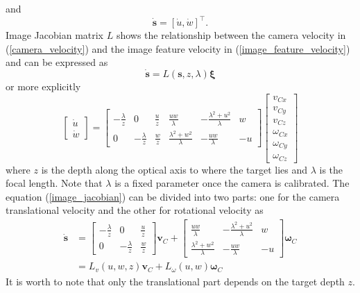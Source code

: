 and 
\begin{equation}
\mathbf{\dot{s}}=[\dot{u}, \dot{w}]^\top.
\label{image_feature_velocity}
\end{equation}
Image Jacobian matrix $L$ shows the relationship between the camera velocity in (\ref{camera_velocity}) and the image feature velocity in (\ref{image_feature_velocity}) and can be expressed as 
\begin{equation}
\mathbf{\dot{s}}=L(\mathbf{s},z,\lambda)\mathbf{\xi}
\end{equation}
or more explicitly
\begin{equation}
\begin{bmatrix}
\dot{u} \\ \dot{w}
\end{bmatrix}
=\begin{bmatrix}
-\frac{\lambda}{z} & 0 & \frac{u}{z} & \frac{uw}{\lambda} & -\frac{\lambda^2+u^2}{\lambda} & w \\
0 & -\frac{\lambda}{z} & \frac{w}{z} & \frac{\lambda^2+w^2}{\lambda} & -\frac{uw}{\lambda} & -u
\end{bmatrix}
\begin{bmatrix}
v_{Cx} \\ v_{Cy} \\ v_{Cz} \\
\omega_{Cx} \\ \omega_{Cy} \\ \omega_{Cz}
\end{bmatrix}
\label{image_jacobian}
\end{equation}
where $z$ is the depth along the optical axis to where the target lies and $\lambda$ is the focal length. Note that $\lambda$ is a fixed parameter once the camera is calibrated. The equation (\ref{image_jacobian}) can be divided into two parts: one for the camera translational velocity and the other for rotational velocity as
\begin{align}
\mathbf{\dot{s}}&=\begin{bmatrix}
-\frac{\lambda}{z} & 0 & \frac{u}{z} \\
0 & -\frac{\lambda}{z} & \frac{w}{z}
\end{bmatrix}\mathbf{v}_C+
\begin{bmatrix}
\frac{uw}{\lambda} & -\frac{\lambda^2+u^2}{\lambda} & w \\
\frac{\lambda^2+w^2}{\lambda} & -\frac{uw}{\lambda} & -u
\end{bmatrix}\mathbf{\omega}_C
\\&=L_v(u,w,z)\mathbf{v}_C+L_{\omega}(u,w)\mathbf{\omega}_C
\label{image_jacobian1}
\end{align}
It is worth to note that only the translational part depends on the target depth $z$. 

